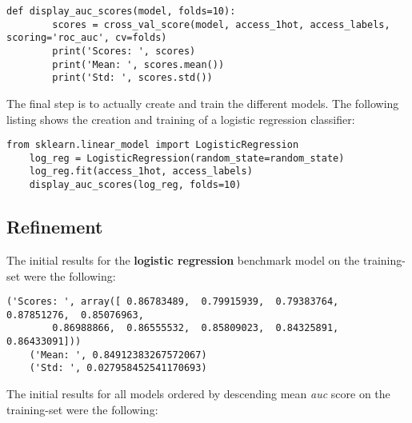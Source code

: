 \documentclass[11pt]{article}
\begin{document}
\begin{lstlisting}[frame=single]
    def display_auc_scores(model, folds=10):
        scores = cross_val_score(model, access_1hot, access_labels, scoring='roc_auc', cv=folds)
        print('Scores: ', scores)
        print('Mean: ', scores.mean())
        print('Std: ', scores.std())
\end{lstlisting}
\noindent
The final step is to actually create and train the different models. 
The following listing shows the creation and training 
of a logistic regression classifier:

\begin{lstlisting}[frame=single]
    from sklearn.linear_model import LogisticRegression
    log_reg = LogisticRegression(random_state=random_state)
    log_reg.fit(access_1hot, access_labels)
    display_auc_scores(log_reg, folds=10)
\end{lstlisting}

\subsection{Refinement}
The initial results for the {\bf logistic regression} benchmark model on the training-set
were the following:
\begin{lstlisting}[frame=single]
    ('Scores: ', array([ 0.86783489,  0.79915939,  0.79383764,  0.87851276,  0.85076963,
        0.86988866,  0.86555532,  0.85809023,  0.84325891,  0.86433091]))
    ('Mean: ', 0.84912383267572067)
    ('Std: ', 0.027958452541170693)
\end{lstlisting}
\noindent
The initial results for all models ordered by descending mean {\it auc} score 
on the training-set were the following:
\end{document}
